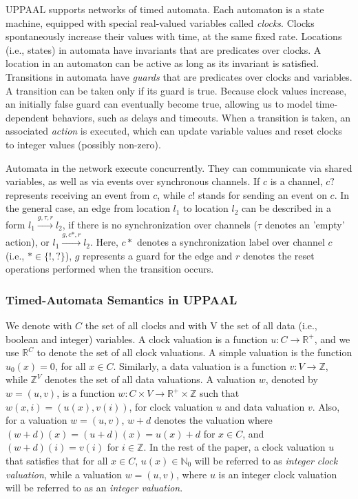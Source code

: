 UPPAAL supports networks of timed automata. Each automaton is a state machine, equipped with special real-valued variables called \textit{clocks}. Clocks spontaneously increase their values with time, at the same fixed rate. Locations (i.e., states) in automata have invariants that are predicates over clocks. A location in an automaton can be active as long as its invariant is satisfied. Transitions in automata have \textit{guards} that are predicates over clocks and variables.  A transition can be taken only if its guard is true.  Because clock values increase, an initially false guard can eventually become true, allowing us to model time-dependent behaviors, such as delays and timeouts.  When a transition is taken, an associated \textit{action} is executed, which can update variable values and reset clocks to integer values (possibly non-zero). 

Automata in the network execute concurrently. They can communicate via shared variables, as well as via events over synchronous channels.  If $c$ is a channel, $c?$ represents receiving an event from $c$, while $c!$ stands for sending an event on $c$. 
In the general case, an edge from location $l_1$ to location $l_2$ can be described in a form 
$
l_1 \xrightarrow{g,\tau,r} l_2
$, 
if there is no synchronization over channels ($\tau$ denotes an 'empty' action), or
$
l_1 \xrightarrow{g,c*,r} l_2
$.
Here, $c*$ denotes a synchronization label over channel $c$ (i.e., $*\in\{!,?\}$), $g$ represents a guard for the edge and $r$ denotes the reset operations performed when the transition occurs. 



\subsubsection{Timed-Automata Semantics in UPPAAL}
We denote with $C$ the set of all clocks and with V the set of all data (i.e., boolean and integer) variables. A clock valuation is a function $u: C\rightarrow \mathbb{R}^+$, and we use $\mathbb{R}^C$ to denote the set of all clock valuations. A simple valuation is the function $u_0(x)=0$, for all $x\in C$. Similarly, a data valuation is a function $v: V\rightarrow \mathbb{Z}$, while $\mathbb{Z}^V$ denotes the set of all data valuations. A valuation $w$, denoted by $w = (u,v)$, is a function $w: C\times V\rightarrow \mathbb{R}^+\times \mathbb{Z}$ such that $w(x,i)=(u(x),v(i))$, for clock valuation $u$ and data valuation $v$. Also, for a valuation $w=(u,v)$, $w+d$ denotes the valuation where $(w+d)(x) = (u+d)(x)=u(x)+d$ for $x\in C$, and $(w+d)(i)=v(i)$ for $i\in\mathbb{Z}$. 
In the rest of the paper, a clock valuation $u$ that satisfies that for all $x\in C$, $u(x)\in\mathbb{N}_0$ will be referred to as \textit{integer clock valuation}, while a valuation $w=(u,v)$, where $u$ is an integer clock valuation will be referred to as an \textit{integer valuation}.

